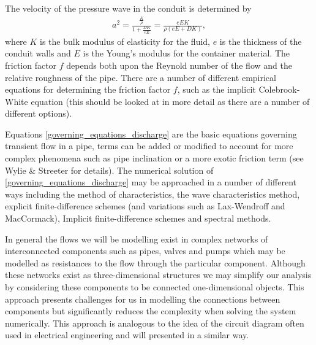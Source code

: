 The velocity of the pressure wave in the conduit is determined by
\begin{align}
a^2 = \frac{\frac{K}{\rho}}{1 + \frac{DK}{eE}} = \frac{eEK}{\rho \left(eE + DK \right)},
\end{align}
where $K$ is the bulk modulus of elasticity for the fluid, $e$ is the thickness of the conduit walls and $E$ is the Young's modulus for the container material. The friction factor $f$ depends both upon the Reynold number of the flow and the relative roughness of the pipe. There are a number of different empirical equations for determining the friction factor $f$, such as the implicit Colebrook-White equation {\color{red}(this should be looked at in more detail as there are a number of different options)}. 

Equations \eqref{governing_equations_discharge} are the basic equations governing transient flow in a pipe, terms can be added or modified to account for more complex phenomena such as pipe inclination or a more exotic friction term (see Wylie \& Streeter for details\cite{streeter78}). The numerical solution of \eqref{governing_equations_discharge} may be approached in a number of different ways including the method of characteristics, the wave characteristics method, explicit finite-difference schemes (and variations such as Lax-Wendroff and MacCormack), Implicit finite-difference schemes and spectral methods. 

In general the flows we will be modelling exist in complex networks of interconnected components such as pipes, valves and pumps which may be modelled as resistances to the flow through the particular component. Although these networks exist as three-dimensional structures we may simplify our analysis by considering these components to be connected one-dimensional objects. This approach presents challenges for us in modelling the connections between components but significantly reduces the complexity when solving the system numerically. This approach is analogous to the idea of the circuit diagram often used in electrical engineering and will presented in a similar way.  
 